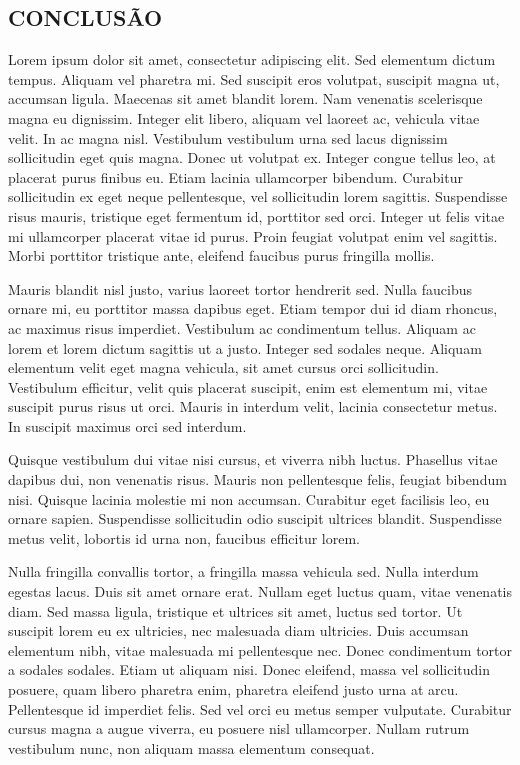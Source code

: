 \documentclass[article,12pt,oneside,a4paper,english,brazil]{unifil}
\begin{document}
\begin{Spacing}{1.5}
\section*{CONCLUSÃO}

Lorem ipsum dolor sit amet, consectetur adipiscing elit. Sed elementum dictum tempus. Aliquam vel pharetra mi. Sed suscipit eros volutpat, suscipit magna ut, accumsan ligula. Maecenas sit amet blandit lorem. Nam venenatis scelerisque magna eu dignissim. Integer elit libero, aliquam vel laoreet ac, vehicula vitae velit. In ac magna nisl. Vestibulum vestibulum urna sed lacus dignissim sollicitudin eget quis magna. Donec ut volutpat ex. Integer congue tellus leo, at placerat purus finibus eu. Etiam lacinia ullamcorper bibendum. Curabitur sollicitudin ex eget neque pellentesque, vel sollicitudin lorem sagittis. Suspendisse risus mauris, tristique eget fermentum id, porttitor sed orci. Integer ut felis vitae mi ullamcorper placerat vitae id purus. Proin feugiat volutpat enim vel sagittis. Morbi porttitor tristique ante, eleifend faucibus purus fringilla mollis.

Mauris blandit nisl justo, varius laoreet tortor hendrerit sed. Nulla faucibus ornare mi, eu porttitor massa dapibus eget. Etiam tempor dui id diam rhoncus, ac maximus risus imperdiet. Vestibulum ac condimentum tellus. Aliquam ac lorem et lorem dictum sagittis ut a justo. Integer sed sodales neque. Aliquam elementum velit eget magna vehicula, sit amet cursus orci sollicitudin. Vestibulum efficitur, velit quis placerat suscipit, enim est elementum mi, vitae suscipit purus risus ut orci. Mauris in interdum velit, lacinia consectetur metus. In suscipit maximus orci sed interdum.

\begin{citacao}
Quisque vestibulum dui vitae nisi cursus, et viverra nibh luctus. Phasellus vitae dapibus dui, non venenatis risus. Mauris non pellentesque felis, feugiat bibendum nisi. Quisque lacinia molestie mi non accumsan. Curabitur eget facilisis leo, eu ornare sapien. Suspendisse sollicitudin odio suscipit ultrices blandit. Suspendisse metus velit, lobortis id urna non, faucibus efficitur lorem.
\end{citacao}

Nulla fringilla convallis tortor, a fringilla massa vehicula sed. Nulla interdum egestas lacus. Duis sit amet ornare erat. Nullam eget luctus quam, vitae venenatis diam. Sed massa ligula, tristique et ultrices sit amet, luctus sed tortor. Ut suscipit lorem eu ex ultricies, nec malesuada diam ultricies. Duis accumsan elementum nibh, vitae malesuada mi pellentesque nec. Donec condimentum tortor a sodales sodales. Etiam ut aliquam nisi. Donec eleifend, massa vel sollicitudin posuere, quam libero pharetra enim, pharetra eleifend justo urna at arcu. Pellentesque id imperdiet felis. Sed vel orci eu metus semper vulputate. Curabitur cursus magna a augue viverra, eu posuere nisl ullamcorper. Nullam rutrum vestibulum nunc, non aliquam massa elementum consequat.

\end{Spacing}
\postextual
\end{document}
